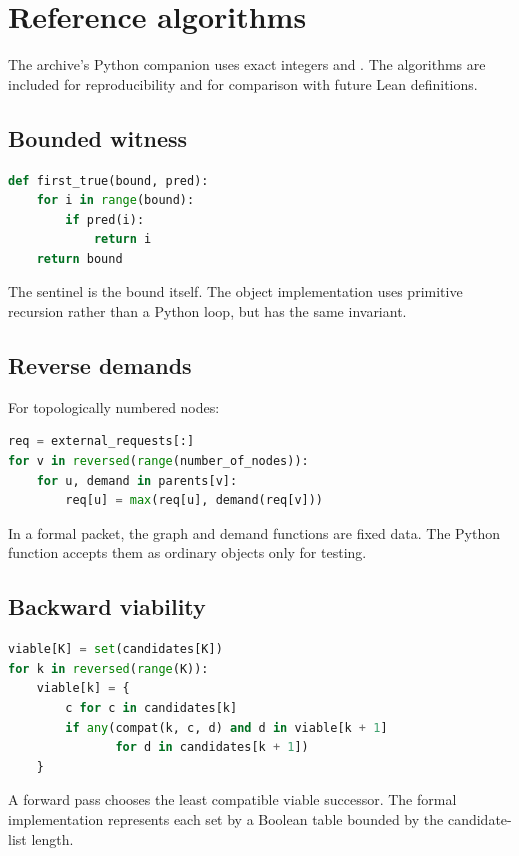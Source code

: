 \section{Reference algorithms}

The archive's Python companion uses exact integers and
.  The algorithms are included for reproducibility
and for comparison with future Lean definitions.

\subsection{Bounded witness}

\begin{lstlisting}[language=Python]
def first_true(bound, pred):
    for i in range(bound):
        if pred(i):
            return i
    return bound
\end{lstlisting}
The sentinel is the bound itself.  The object implementation uses primitive
recursion rather than a Python loop, but has the same invariant.

\subsection{Reverse demands}

For topologically numbered nodes:
\begin{lstlisting}[language=Python]
req = external_requests[:]
for v in reversed(range(number_of_nodes)):
    for u, demand in parents[v]:
        req[u] = max(req[u], demand(req[v]))
\end{lstlisting}
In a formal packet, the graph and demand functions are fixed data.  The
Python function accepts them as ordinary objects only for testing.

\subsection{Backward viability}

\begin{lstlisting}[language=Python]
viable[K] = set(candidates[K])
for k in reversed(range(K)):
    viable[k] = {
        c for c in candidates[k]
        if any(compat(k, c, d) and d in viable[k + 1]
               for d in candidates[k + 1])
    }
\end{lstlisting}
A forward pass chooses the least compatible viable successor.  The formal
implementation represents each set by a Boolean table bounded by the
candidate-list length.

